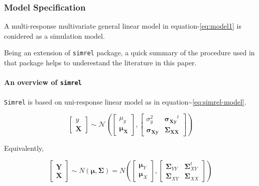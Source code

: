 \documentclass[12pt,A4paper,authoryear]{elsarticle} %
\begin{document}
\subsubsection{Model Specification}\label{model-specification}

A multi-response multivariate general linear model in
equation-\eqref{eq:model1} is conidered as a simulation model.

Being an extension of \texttt{simrel} package, a quick summary of the
procedure used in that package helps to underestand the literature in
this paper.

\paragraph{\texorpdfstring{An overview of
\texttt{simrel}}{An overview of simrel}}\label{an-overview-of-simrel}

\texttt{Simrel} is based on uni-response linear model as in
equation\textasciitilde{}\eqref{eq:simrel-model}.

\begin{equation}
\label{eq:simrel-model}
  \begin{bmatrix}
    y \\ \mathbf{X}
  \end{bmatrix} \sim
  \mathcal{N}\left(
    \begin{bmatrix}
      \mu_y \\ \boldsymbol{\mu_X}
    \end{bmatrix},
    \begin{bmatrix}
      \sigma_y^2               & \boldsymbol{\sigma_{Xy}}^t \\
      \boldsymbol{\sigma_{Xy}} & \boldsymbol{\Sigma_{XX}}
    \end{bmatrix}
  \right)
\end{equation}

Equivalently,

\begin{equation}
  \begin{bmatrix}\mathbf{Y}\\ \mathbf{X}\end{bmatrix} \sim N(\boldsymbol{\mu}, \boldsymbol{\Sigma})
  = N \left(
    \begin{bmatrix}
      \boldsymbol{\mu}_Y \\
      \boldsymbol{\mu}_X
    \end{bmatrix},
    \begin{bmatrix}
      \boldsymbol{\Sigma}_{YY} & \boldsymbol{\Sigma}_{XY}^t \\
      \boldsymbol{\Sigma}_{XY} & \boldsymbol{\Sigma}_{XX}
    \end{bmatrix}
  \right)
  \label{eq:model2}
\end{equation}
\end{document}
